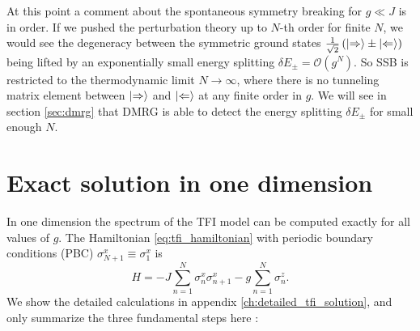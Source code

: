 \vspace*{1em}
\noindent At this point a comment about the spontaneous symmetry breaking for $g \ll J$ is in order. If we pushed the perturbation theory up to $N$-th order for finite $N$, we would see the degeneracy between the symmetric ground states $\frac{1}{\sqrt{2}} \left( \ket{\Rightarrow} \pm \ket{\Leftarrow} \right)$ being lifted by an exponentially small energy splitting $\delta E_{\pm} = \mathcal{O}(g^N)$. So SSB is restricted to the thermodynamic limit $N \to \infty$, where there is no tunneling matrix element between $\ket{\Rightarrow}$ and $\ket{\Leftarrow}$ at any finite order in $g$. We will see in section \ref{sec:dmrg} that DMRG is able to detect the energy splitting $\delta E_{\pm}$ for small enough $N$.


\section{Exact solution in one dimension} \label{sec:tfi_exact_solution}
\noindent In one dimension the spectrum of the TFI model can be computed exactly for all values of $g$. The Hamiltonian \eqref{eq:tfi_hamiltonian} with periodic boundary conditions (PBC) $\sigma^x_{N+1} \equiv \sigma^x_1$ is
\begin{equation} \label{eq_ising_hamiltonian_1d}
	H = -J \sum_{n=1}^N \sigma^x_n \sigma^x_{n+1} - g \sum_{n=1}^N \sigma^z_n.
\end{equation}
We show the detailed calculations in appendix \ref{ch:detailed_tfi_solution}, and only summarize the three fundamental steps here \cite{pfeuty1970one, sachdev2011quantum}:
